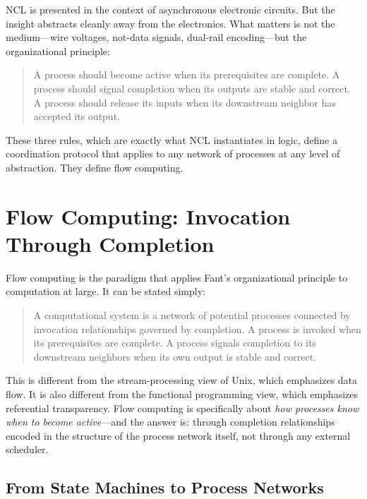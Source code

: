 \documentclass[12pt, a4paper]{article}
\begin{document}
NCL is presented in the context of asynchronous electronic circuits.
But the insight abstracts cleanly away from the electronics. What
matters is not the medium---wire voltages, not-data signals,
dual-rail encoding---but the organizational principle:

\begin{quote}
A process should become active when its prerequisites are complete.
A process should signal completion when its outputs are stable and correct.
A process should release its inputs when its downstream neighbor
has accepted its output.
\end{quote}

These three rules, which are exactly what NCL instantiates in logic,
define a coordination protocol that applies to any network of processes
at any level of abstraction. They define flow computing.

\section{Flow Computing: Invocation Through Completion}

Flow computing is the paradigm that applies Fant's organizational
principle to computation at large. It can be stated simply:

\begin{quote}
A computational system is a network of potential processes connected
by invocation relationships governed by completion. A process is
invoked when its prerequisites are complete. A process signals
completion to its downstream neighbors when its own output is stable
and correct.
\end{quote}

This is different from the stream-processing view of Unix, which
emphasizes data flow. It is also different from the functional
programming view, which emphasizes referential transparency. Flow
computing is specifically about \emph{how processes know when to
become active}---and the answer is: through completion relationships
encoded in the structure of the process network itself, not through
any external scheduler.

\subsection{From State Machines to Process Networks}
\end{document}

